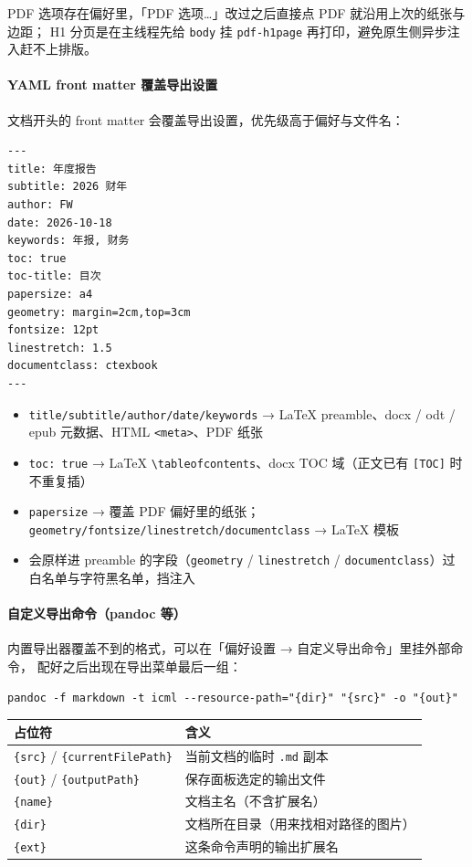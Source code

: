 \documentclass[11pt,a4paper]{ctexart}
\begin{document}
PDF 选项存在偏好里，「PDF 选项…」改过之后直接点 PDF 就沿用上次的纸张与边距；
H1 分页是在主线程先给 \texttt{body} 挂 \texttt{pdf-h1page} 再打印，避免原生侧异步注入赶不上排版。

\paragraph{YAML front matter 覆盖导出设置}

文档开头的 front matter 会覆盖导出设置，优先级高于偏好与文件名：

\begin{verbatim}
---
title: 年度报告
subtitle: 2026 财年
author: FW
date: 2026-10-18
keywords: 年报, 财务
toc: true
toc-title: 目次
papersize: a4
geometry: margin=2cm,top=3cm
fontsize: 12pt
linestretch: 1.5
documentclass: ctexbook
---
\end{verbatim}

\begin{itemize}
\item \texttt{title/subtitle/author/date/keywords} → LaTeX preamble、docx / odt / epub 元数据、HTML \texttt{\textless{}meta\textgreater{}}、PDF 纸张
\item \texttt{toc: true} → LaTeX \texttt{\textbackslash{}tableofcontents}、docx TOC 域（正文已有 \texttt{[TOC]} 时不重复插）
\item \texttt{papersize} → 覆盖 PDF 偏好里的纸张；\texttt{geometry/fontsize/linestretch/documentclass} → LaTeX 模板
\item 会原样进 preamble 的字段（\texttt{geometry} / \texttt{linestretch} / \texttt{documentclass}）过白名单与字符黑名单，挡注入
\end{itemize}


\paragraph{自定义导出命令（pandoc 等）}

内置导出器覆盖不到的格式，可以在「偏好设置 → 自定义导出命令」里挂外部命令，
配好之后出现在导出菜单最后一组：

\begin{verbatim}
pandoc -f markdown -t icml --resource-path="{dir}" "{src}" -o "{out}"
\end{verbatim}

\begin{center}
\begin{tabular}{ll}
\hline
\textbf{占位符} & \textbf{含义} \\
\hline
\texttt{\{src\}} / \texttt{\{currentFilePath\}} & 当前文档的临时 \texttt{.md} 副本 \\
\texttt{\{out\}} / \texttt{\{outputPath\}} & 保存面板选定的输出文件 \\
\texttt{\{name\}} & 文档主名（不含扩展名） \\
\texttt{\{dir\}} & 文档所在目录（用来找相对路径的图片） \\
\texttt{\{ext\}} & 这条命令声明的输出扩展名 \\
\hline
\end{tabular}
\end{center}
\end{document}
